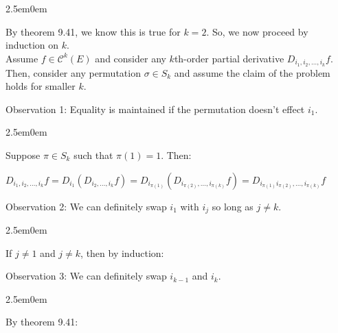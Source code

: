 \documentclass{book}
\newcommand{\exTwo}{%
   \color{RedViolet}%
   \fontsize{13}{15}\selectfont%
}
\newcommand{\exP}{%
   \color{VioletRed}%
   \fontsize{12}{14}\selectfont%
}
\newenvironment{myIndent}{%
   \begin{adjustwidth}{2.5em}{0em}%
}{%
   \end{adjustwidth}%
}
\newcommand{\retTwo}{\hfill\bigbreak}
\begin{document}
{\begin{myIndent}\exTwo
   By theorem 9.41, we know this is true for $k = 2$. So, we now proceed by\\ induction on $k$.\\

   Assume $f \in \mathscr{C}^k(E)$ and consider any $k$th-order partial derivative $D_{i_1,i_2,\ldots,i_k}f$.\\ Then, consider any permutation $\sigma \in S_k$ and assume the claim of the problem\\ holds for smaller $k$.\retTwo
   
   Observation 1: Equality is maintained if the permutation doesn't effect $i_1$.
   {\begin{myIndent}\exP
      Suppose $\pi \in S_k$ such that $\pi(1) = 1$. Then:

      {\center $D_{i_1,i_2,\ldots,i_k}f = D_{i_1}\left(D_{i_2,\ldots,i_k}f\right) = D_{i_{\pi(1)}}\left(D_{i_{\pi(2)},\ldots,i_{\pi(k)}}f\right) = D_{i_{\pi(1)}i_{\pi(2)},\ldots,i_{\pi(k)}}f$\par}
   \end{myIndent}}

   \newpage

   Observation 2: We can definitely swap $i_1$ with $i_j$ so long as $j \neq k$.
   {\begin{myIndent}\exP
      If $j \neq 1$ and $j \neq k$, then by induction:\\ [-26pt]

      {\retTwo\par}
   \end{myIndent}}

   Observation 3: We can definitely swap $i_{k-1}$ and $i_{k}$.
   {\begin{myIndent}\exP
      By theorem 9.41:\\ [-26pt]

      {\\ [12pt]\par}
   \end{myIndent}}


\end{myIndent}}
\end{document}
